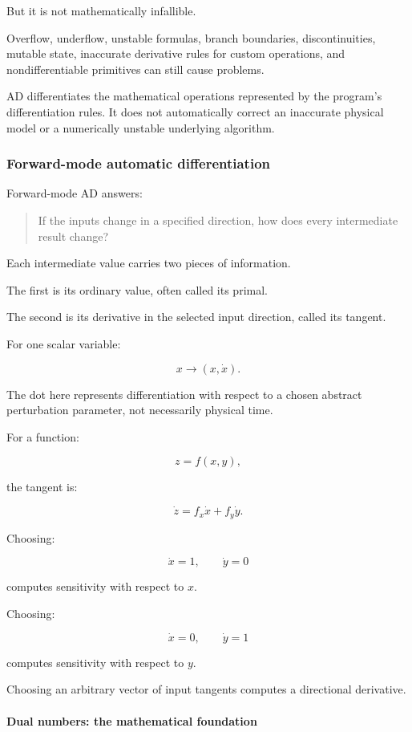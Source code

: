 But it is not mathematically infallible.

Overflow, underflow, unstable formulas, branch boundaries, discontinuities, mutable state, inaccurate derivative rules for custom operations, and nondifferentiable primitives can still cause problems.

AD differentiates the mathematical operations represented by the program's differentiation rules. It does not automatically correct an inaccurate physical model or a numerically unstable underlying algorithm.

\subsubsection{Forward-mode automatic differentiation}\label{forward-mode-automatic-differentiation}

Forward-mode AD answers:

\begin{quote}
If the inputs change in a specified direction, how does every intermediate result change?
\end{quote}

Each intermediate value carries two pieces of information.

The first is its ordinary value, often called its primal.

The second is its derivative in the selected input direction, called its tangent.

For one scalar variable:

\[
x\longrightarrow(x,\dot x).
\]

The dot here represents differentiation with respect to a chosen abstract perturbation parameter, not necessarily physical time.

For a function:

\[
z=f(x,y),
\]

the tangent is:

\[
\dot z=f_x\dot x+f_y\dot y.
\]

Choosing:

\[
\dot x=1,\qquad \dot y=0
\]

computes sensitivity with respect to \(x\).

Choosing:

\[
\dot x=0,\qquad \dot y=1
\]

computes sensitivity with respect to \(y\).

Choosing an arbitrary vector of input tangents computes a directional derivative.

\paragraph{Dual numbers: the mathematical foundation}\label{dual-numbers-the-mathematical-foundation}

